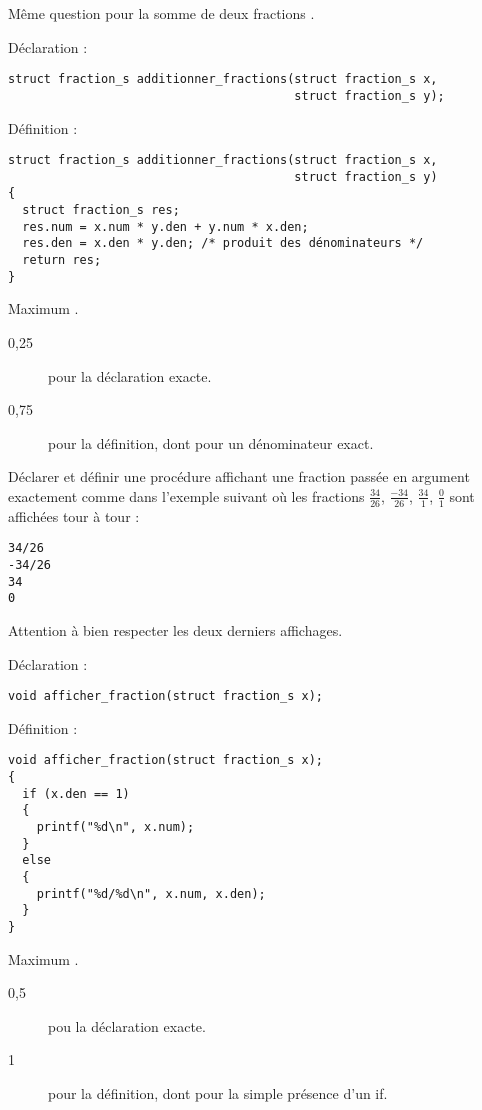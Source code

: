 \question Même question pour la somme de deux fractions
    .

\begin{correction}
Déclaration :
\begin{verbatim}
struct fraction_s additionner_fractions(struct fraction_s x, 
                                        struct fraction_s y);
\end{verbatim}
Définition :
\begin{verbatim}
struct fraction_s additionner_fractions(struct fraction_s x, 
                                        struct fraction_s y)
{
  struct fraction_s res;
  res.num = x.num * y.den + y.num * x.den;
  res.den = x.den * y.den; /* produit des dénominateurs */
  return res;
}
\end{verbatim}

\begin{baremeenv}
Maximum .
  \begin{description}
  \item[0,25] pour la déclaration exacte.
  \item[0,75] pour la définition, dont \pt[0,5] pour un dénominateur exact.
\end{description}
\end{baremeenv}  
\end{correction}


\question Déclarer et définir une procédure affichant une fraction
passée en argument exactement comme dans l'exemple suivant où les
fractions $\frac{34}{26}$, $\frac{-34}{26}$, $\frac{34}{1}$,
$\frac{0}{1}$ sont affichées tour à tour :
\begin{verbatim}
34/26
-34/26
34 
0
\end{verbatim}
Attention à bien respecter les deux derniers affichages.

\begin{correction}
Déclaration :
\begin{verbatim}
void afficher_fraction(struct fraction_s x);
\end{verbatim}
Définition :
\begin{verbatim}
void afficher_fraction(struct fraction_s x);
{
  if (x.den == 1)
  {
    printf("%d\n", x.num);
  }
  else
  {
    printf("%d/%d\n", x.num, x.den);
  }
}
\end{verbatim}
\begin{baremeenv}
Maximum .
  \begin{description}
  \item[0,5] pou la déclaration exacte.
  \item[1] pour la définition, dont  pour la simple présence d'un if.
 \end{description}
\end{baremeenv}  
\end{correction}

